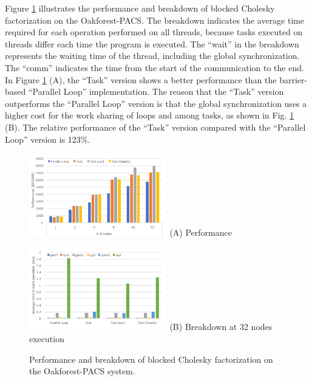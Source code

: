 ﻿\documentclass[graybox]{svmult}
\begin{document}
Figure \ref{FIG_OFP_CH} illustrates the performance and breakdown of blocked Cholesky factorization on the Oakforest-PACS. The breakdown indicates the average time required for each operation performed on all threads, because tasks executed on threads differ each time the program is executed. The ``wait'' in the breakdown represents the waiting time of the thread, including the global synchronization. The ``comm'' indicates the time from the start of the communication to the end.
In Figure \ref{FIG_OFP_CH} (A), the ``Task'' version shows a better performance than the barrier-based ``Parallel Loop'' implementation. The reason that the ``Task'' version outperforms the ``Parallel Loop'' version is that the global synchronization uses a higher cost for the work sharing of loops and among tasks, as shown in Fig. \ref{FIG_OFP_CH} (B). The relative performance of the ``Task'' version compared with the ``Parallel Loop'' version is 123\%.

\begin{figure}[htbp]
\begin{minipage}{0.5\hsize}
\begin{center}
\includegraphics[bb=0 0 360 216, width=6cm]{./figure/FIG_OFP_CH3.pdf}
\hspace{1.6cm} (A) Performance
\end{center}
\end{minipage}\begin{minipage}{0.5\hsize}
\begin{center}
\includegraphics[bb=0 0 360 216, width=6cm]{./figure/FIG_OFP_CH_BD3.pdf}
\hspace{1.6cm} (B) Breakdown at 32 nodes execution
\end{center}
\end{minipage}
\caption{Performance and breakdown of blocked Cholesky factorization on the Oakforest-PACS system.}
\label{FIG_OFP_CH}
\end{figure}
\end{document}
